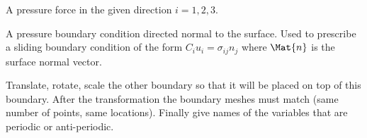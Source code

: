 %
A pressure force in the given direction $i=1,2,3$.

%
A pressure boundary condition directed normal to the surface.
%
%
Used to prescribe a sliding boundary condition of the form $C_i u_i = \sigma_{ij}n_j$ where $\Mat{n}$ is the surface normal vector.
\sifend

\sifbegin
%

%
%
%
%
Translate, rotate, scale the other boundary so that it will be placed on top of this boundary. After the transformation
the boundary meshes must match (same number of points, same locations). Finally give names of the variables that are
periodic or anti-periodic.



  \sifend

 \sifend
